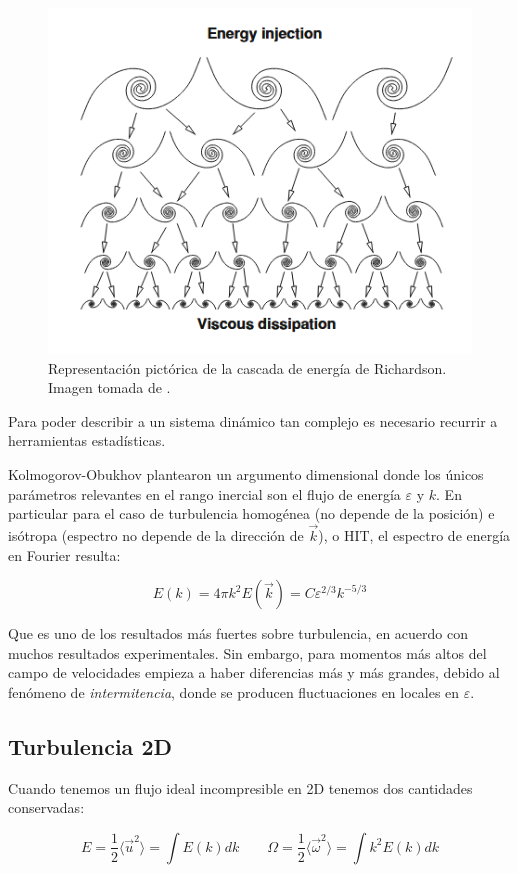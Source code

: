 \begin{figure}[!th]
	\centering
	\includegraphics[width=0.53\linewidth]{Figures/Antecedentes_teoricos/Energy_cascade}
	\caption{Representación pictórica de la cascada de energía de Richardson. Imagen tomada de \cite{nazarenkoWaveTurbulence2011}.}
	\label{fig:energycascade}
\end{figure}


Para poder describir a un sistema dinámico tan complejo es necesario recurrir a herramientas estadísticas. 


Kolmogorov-Obukhov plantearon un argumento dimensional donde los únicos parámetros relevantes en el rango inercial son el flujo de energía $\varepsilon$ y $k$. En particular para el caso de turbulencia homogénea (no depende de la posición) e isótropa (espectro no depende de la dirección de $\vec k$), o HIT, el espectro de energía en Fourier resulta:

\begin{equation}
	E(k) = 4\pi k^2E(\vec k) = C\varepsilon^{2/3}k^{-5/3}
\end{equation}

Que es uno de los resultados más fuertes sobre turbulencia, en acuerdo con muchos resultados experimentales. Sin embargo, para momentos más altos del campo de velocidades empieza a haber diferencias más y más grandes, debido al fenómeno de \textit{intermitencia}, donde se producen fluctuaciones en locales en $\varepsilon$.

\subsection*{Turbulencia 2D}
Cuando tenemos un flujo ideal incompresible en 2D tenemos dos cantidades conservadas:

\begin{equation}
	E = \frac{1}{2}\langle \vec u^2 \rangle = \int E(k) dk \qquad \Omega = \frac{1}{2} \langle \vec \omega^2 \rangle = \int k^2 E(k) dk
\end{equation}

